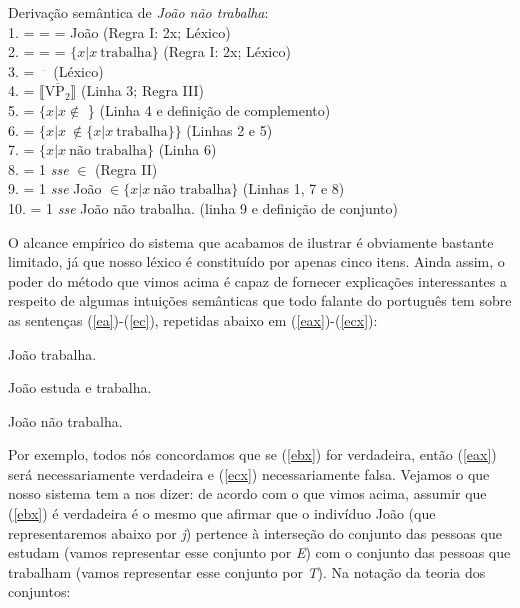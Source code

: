 \begin{exe}
	\ex Derivação semântica de \textit{João não trabalha}: \\
	1.  =  =  = João \hfill (Regra I: 2x; Léxico)\\
	2.  =  =  = $\{x | x\ \text{trabalha}\}$ \hfill (Regra I: 2x; Léxico)\\
	3.  = $^{\overline{\ \ \ \ }}$ \hfill (Léxico)\\
	4.  = $\overline{\llbracket \text{VP}_{2} \rrbracket}$ \hfill (Linha 3; Regra III)\\
	5.  = $\{x | x \not\in$ \} \hfill (Linha 4 e defini\-ção de complemento)\\
	6.  = $\{x | x\ \not\in \{x | x\ \text{trabalha}\}\}$ \hfill (Linhas 2 e 5)\\
	7.  = $\{x | x\ \text{não trabalha}\}$ \hfill (Linha 6)\\
	8.  = 1 \textit{sse}  $\in$  \hfill (Regra II)\\
	9.  = 1 \textit{sse} João $\in \{x | x\ \text{não trabalha}\}$ \hfill (Linhas 1, 7 e 8)\\
	10.  = 1 \textit{sse} João não trabalha. \hfill (linha 9 e defini\-ção de conjunto)
\end{exe}

O alcance empírico do sistema que acabamos de ilustrar é
obviamente bastante limitado, já que nosso léxico é constituído
por apenas cinco itens. Ainda assim, o poder do método 
que vimos acima é capaz de fornecer explica\-çõ\-es interessantes
a respeito de algumas intui\-çõ\-es semânticas que todo falante do
português tem sobre as sen\-ten\-ças (\ref{ea})-(\ref{ec}), repetidas abaixo em (\ref{eax})-(\ref{ecx}):

\begin{exe}
	\ex João trabalha.\label{eax}
	\end{exe}

\begin{exe}
	\ex João estuda e trabalha.\label{ebx}
\end{exe}

\begin{exe}
	\ex João não trabalha.\label{ecx}
\end{exe}


\n Por exemplo,
todos nós concordamos que se (\ref{ebx}) for verdadeira, então
(\ref{eax}) será necessariamente verdadeira e (\ref{ecx})
necessariamente falsa. Vejamos o que nosso sistema tem a nos
dizer: de acordo com o que vimos acima, assumir que (\ref{ebx}) é
verdadeira é o mesmo que afirmar que o indivíduo João (que
representaremos abaixo por \textit{j}) pertence à interse\-ção do
conjunto das pessoas que estudam (vamos representar esse
conjunto por \textit{E}) com o conjunto das pessoas que trabalham
(vamos representar esse conjunto
por \textit{T}). Na nota\-ção da teoria dos conjuntos:

